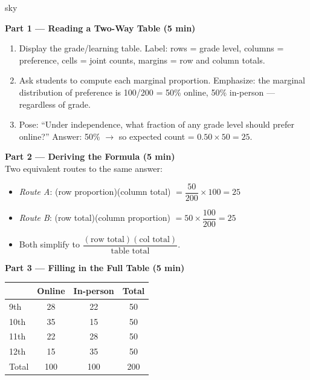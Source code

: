 \documentclass[10pt]{article}
\begin{document}
\begin{skillbox}[Lesson]{sky}
\begin{minipage}[t]{0.48\linewidth}
    \textbf{Part 1 --- Reading a Two-Way Table (5 min)}
    \begin{enumerate}
        \item Display the grade/learning table. Label: rows = grade level, columns = preference,
              cells = joint counts, margins = row and column totals.
        \item Ask students to compute each marginal proportion.
              Emphasize: the marginal distribution of preference is 100/200 = 50\% online,
              50\% in-person --- regardless of grade.
        \item Pose: ``Under independence, what fraction of any grade level should prefer
              online?'' Answer: 50\% $\to$ so expected count = $0.50 \times 50 = 25$.
    \end{enumerate}

    \textbf{Part 2 --- Deriving the Formula (5 min)}\\
    Two equivalent routes to the same answer:
    \begin{itemize}
        \item \textit{Route A}: (row proportion)(column total)
              $= \dfrac{50}{200} \times 100 = 25$
        \item \textit{Route B}: (row total)(column proportion)
              $= 50 \times \dfrac{100}{200} = 25$
        \item Both simplify to $\dfrac{(\text{row total})(\text{col total})}{\text{table total}}$.
    \end{itemize}
\end{minipage}
\hfill
\begin{minipage}[t]{0.48\linewidth}
    \textbf{Part 3 --- Filling in the Full Table (5 min)}

    \renewcommand{\arraystretch}{1.4}
    \begin{tabular}{lccc}
        & \textbf{Online} & \textbf{In-person} & \textbf{Total} \\
        \hline
        9th  & 28 & 22 & 50 \\
        10th & 35 & 15 & 50 \\
        11th & 22 & 28 & 50 \\
        12th & 15 & 35 & 50 \\
        \hline
        Total & 100 & 100 & 200 \\
    \end{tabular}


\end{minipage}
\end{skillbox}
\end{document}
